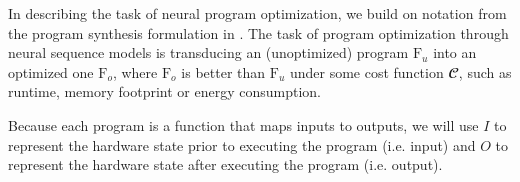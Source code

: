 \documentclass{article}
\begin{document}
In describing the task of neural program optimization, we build on notation from the program synthesis formulation in \cite{bunel2018leveraging}. The task of program optimization through neural sequence models is transducing an (unoptimized) program $\text{F}_u$ into an optimized one $\text{F}_o$, where $\text{F}_o$ is better than $\text{F}_u$ under some cost function $\mathbfcal{C}$, such as runtime, memory footprint or energy consumption.

Because each program is a function that maps inputs to outputs, we will use $I$ to represent the hardware state prior to executing the program (i.e. input) and $O$ to represent the hardware state after executing the program (i.e. output).




\end{document}
